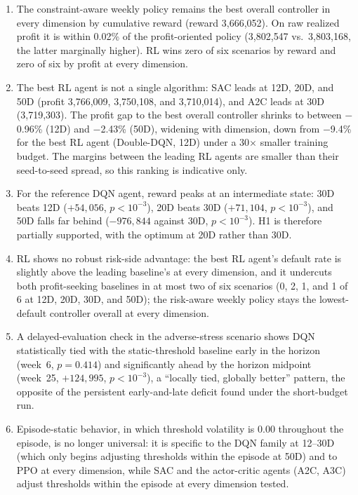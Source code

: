 \documentclass[preprint,review,authoryear,12pt]{elsarticle}
\begin{document}
\begin{enumerate}[leftmargin=*,label=(\arabic*)]
    \item The constraint-aware weekly policy remains the best overall controller in every
          dimension by cumulative reward (reward 3{,}666{,}052). On raw realized profit it
          is within 0.02\% of the profit-oriented policy (3{,}802{,}547 vs.\
          3{,}803{,}168, the latter marginally higher). RL wins zero of six scenarios by
          reward and zero of six by profit at every dimension.
    \item The best RL agent is not a single algorithm: SAC leads at 12D, 20D, and 50D
          (profit 3{,}766{,}009, 3{,}750{,}108, and 3{,}710{,}014), and A2C leads at 30D
          (3{,}719{,}303). The profit gap to the best overall controller shrinks to between
          $-$0.96\% (12D) and $-$2.43\% (50D), widening with dimension, down from
          $-$9.4\% for the best RL agent (Double-DQN, 12D) under a 30$\times$ smaller
          training budget. The margins between the leading RL agents are smaller than their
          seed-to-seed spread, so this ranking is indicative only.
    \item For the reference DQN agent, reward peaks at an intermediate state: 30D beats
          12D ($+54{,}056$, $p<10^{-3}$), 20D beats 30D ($+71{,}104$, $p<10^{-3}$), and 50D
          falls far behind ($-976{,}844$ against 30D, $p<10^{-3}$). H1 is therefore
          partially supported, with the optimum at 20D rather than 30D.
    \item RL shows no robust risk-side advantage: the best RL agent's default rate is
          slightly above the leading baseline's at every dimension, and it undercuts both
          profit-seeking baselines in at most two of six scenarios (0, 2, 1, and 1 of 6 at
          12D, 20D, 30D, and 50D); the risk-aware weekly policy stays the lowest-default
          controller overall at every dimension.
    \item A delayed-evaluation check in the adverse-stress scenario shows DQN statistically
          tied with the static-threshold baseline early in the horizon (week~6, $p=0.414$)
          and significantly ahead by the horizon midpoint (week~25, $+124{,}995$,
          $p<10^{-3}$), a ``locally tied, globally better'' pattern, the opposite of the
          persistent early-and-late deficit found under the short-budget run.
    \item Episode-static behavior, in which threshold volatility is 0.00 throughout the
          episode, is no longer universal: it is specific to the DQN family at 12--30D
          (which only begins adjusting thresholds within the episode at 50D) and to PPO at
          every dimension, while SAC and the actor-critic agents (A2C, A3C) adjust
          thresholds within the episode at every dimension tested.
\end{enumerate}
\end{document}
